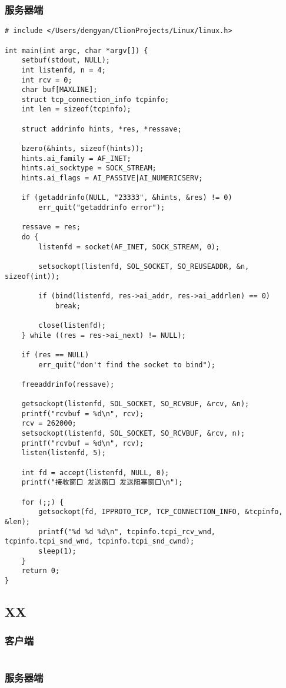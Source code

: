 \subsubsection{服务器端}
\begin{verbatim}
# include </Users/dengyan/ClionProjects/Linux/linux.h>

int main(int argc, char *argv[]) {
    setbuf(stdout, NULL);
    int listenfd, n = 4;
    int rcv = 0;
    char buf[MAXLINE];
    struct tcp_connection_info tcpinfo;
    int len = sizeof(tcpinfo);

    struct addrinfo hints, *res, *ressave;

    bzero(&hints, sizeof(hints));
    hints.ai_family = AF_INET;
    hints.ai_socktype = SOCK_STREAM;
    hints.ai_flags = AI_PASSIVE|AI_NUMERICSERV;

    if (getaddrinfo(NULL, "23333", &hints, &res) != 0)
        err_quit("getaddrinfo error");

    ressave = res;
    do {
        listenfd = socket(AF_INET, SOCK_STREAM, 0);

        setsockopt(listenfd, SOL_SOCKET, SO_REUSEADDR, &n, sizeof(int));

        if (bind(listenfd, res->ai_addr, res->ai_addrlen) == 0)
            break;

        close(listenfd);
    } while ((res = res->ai_next) != NULL);

    if (res == NULL)
        err_quit("don't find the socket to bind");

    freeaddrinfo(ressave);

    getsockopt(listenfd, SOL_SOCKET, SO_RCVBUF, &rcv, &n);
    printf("rcvbuf = %d\n", rcv);
    rcv = 262000;
    setsockopt(listenfd, SOL_SOCKET, SO_RCVBUF, &rcv, n);
    printf("rcvbuf = %d\n", rcv);
    listen(listenfd, 5);

    int fd = accept(listenfd, NULL, 0);
    printf("接收窗口 发送窗口 发送阻塞窗口\n");

    for (;;) {
        getsockopt(fd, IPPROTO_TCP, TCP_CONNECTION_INFO, &tcpinfo, &len);
        printf("%d %d %d\n", tcpinfo.tcpi_rcv_wnd, tcpinfo.tcpi_snd_wnd, tcpinfo.tcpi_snd_cwnd);
        sleep(1);
    }
    return 0;
}
\end{verbatim}

\subsection{XX}
\subsubsection{客户端}
\begin{verbatim}

\end{verbatim}

\subsubsection{服务器端}
\begin{verbatim}

\end{verbatim}


